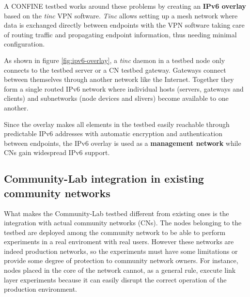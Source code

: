 \documentclass[conference]{IEEEtran}
\begin{document}
A CONFINE testbed works around these problems by creating an \textbf{IPv6
  overlay} based on the \emph{tinc} \cite{tinc} VPN software.  \emph{Tinc}
allows setting up a mesh network where data is exchanged directly between
endpoints with the VPN software taking care of routing traffic and propagating
endpoint information, thus needing minimal configuration.

As shown in figure \ref{fig:ipv6-overlay}, a \emph{tinc} daemon in a testbed
node only connects to the testbed server or a CN testbed gateway.  Gateways
connect between themselves through another network like the Internet.
Together they form a single routed IPv6 network where individual hosts
(servers, gateways and clients) and subnetworks (node devices and slivers)
become available to one another.

Since the overlay makes all elements in the testbed easily reachable through
predictable IPv6 addresses with automatic encryption and authentication
between endpoints, the IPv6 overlay is used as a \textbf{management network}
while CNs gain widespread IPv6 support.






\subsection{Community-Lab integration in existing community networks}

What makes the Community-Lab testbed different from existing ones is the integration
with actual community networks (CNs). The nodes belonging to the testbed are deployed among the 
community network to be able to perform experiments in a real enviroment with real users. However 
these networks are indeed production networks, so the experiments must have some limitations or provide some
degree of protection to community network owners. For instance, nodes placed in the core of the network
cannot, as a general rule, execute link layer experiments because it can easily disrupt the correct
operation of the production environment.




\end{document}
